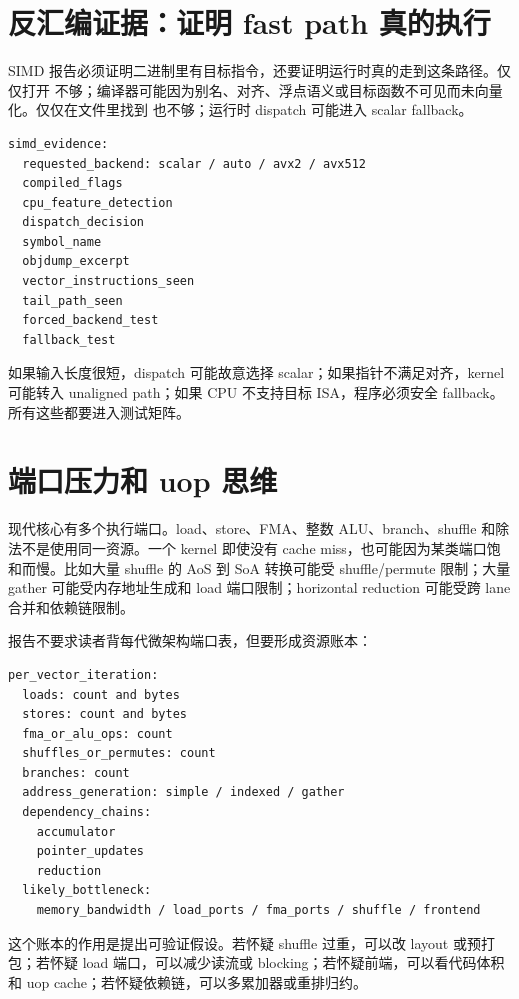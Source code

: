 \section{反汇编证据：证明 fast path 真的执行}

SIMD 报告必须证明二进制里有目标指令，还要证明运行时真的走到这条路径。仅仅打开  不够；编译器可能因为别名、对齐、浮点语义或目标函数不可见而未向量化。仅仅在文件里找到  也不够；运行时 dispatch 可能进入 scalar fallback。

\begin{lstlisting}[numbers=none,caption={SIMD 证据字段}]
simd_evidence:
  requested_backend: scalar / auto / avx2 / avx512
  compiled_flags
  cpu_feature_detection
  dispatch_decision
  symbol_name
  objdump_excerpt
  vector_instructions_seen
  tail_path_seen
  forced_backend_test
  fallback_test
\end{lstlisting}

如果输入长度很短，dispatch 可能故意选择 scalar；如果指针不满足对齐，kernel 可能转入 unaligned path；如果 CPU 不支持目标 ISA，程序必须安全 fallback。所有这些都要进入测试矩阵。

\section{端口压力和 uop 思维}

现代核心有多个执行端口。load、store、FMA、整数 ALU、branch、shuffle 和除法不是使用同一资源。一个 kernel 即使没有 cache miss，也可能因为某类端口饱和而慢。比如大量 shuffle 的 AoS 到 SoA 转换可能受 shuffle/permute 限制；大量 gather 可能受内存地址生成和 load 端口限制；horizontal reduction 可能受跨 lane 合并和依赖链限制。

报告不要求读者背每代微架构端口表，但要形成资源账本：

\begin{lstlisting}[numbers=none,caption={端口压力账本}]
per_vector_iteration:
  loads: count and bytes
  stores: count and bytes
  fma_or_alu_ops: count
  shuffles_or_permutes: count
  branches: count
  address_generation: simple / indexed / gather
  dependency_chains:
    accumulator
    pointer_updates
    reduction
  likely_bottleneck:
    memory_bandwidth / load_ports / fma_ports / shuffle / frontend
\end{lstlisting}

这个账本的作用是提出可验证假设。若怀疑 shuffle 过重，可以改 layout 或预打包；若怀疑 load 端口，可以减少读流或 blocking；若怀疑前端，可以看代码体积和 uop cache；若怀疑依赖链，可以多累加器或重排归约。

